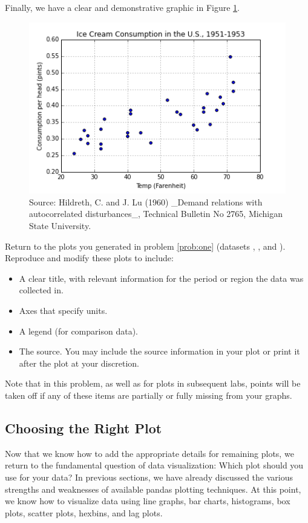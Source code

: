 Finally, we have a clear and demonstrative graphic in Figure \ref{fig:labels}.

\begin{figure}[H]
    \centering
    \includegraphics[width=.75\textwidth]{Icecream.png}
    \caption{Source:  Hildreth, C. and J. Lu (1960) \_Demand relations with autocorrelated disturbances\_, Technical Bulletin No 2765, Michigan State University.}
    \label{fig:labels}
\end{figure}

\begin{problem}
Return to the plots you generated in problem \ref{prob:one} (datasets , , and ).
Reproduce and modify these plots to include:
\begin{itemize}
\item A clear title, with relevant information for the period or region the data was collected in.
\item Axes that specify units.
\item A legend (for comparison data).
\item The source. You may include the source information in your plot or print it after the plot at your discretion.
\end{itemize}
Note that in this problem, as well as for plots in subsequent labs, points will be taken off if any of these items are partially or fully missing from your graphs.
\end{problem}


\subsection*{Choosing the Right Plot}
Now that we know how to add the appropriate details for remaining plots, we return to the fundamental question of data visualization: Which plot should you use for your data?
In previous sections, we have already discussed the various strengths and weaknesses of available pandas plotting techniques.
At this point, we know how to visualize data using line graphs, bar charts, histograms, box plots, scatter plots, hexbins, and lag plots.

